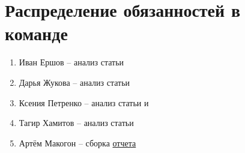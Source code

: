 
\section{Распределение обязанностей в команде}

\begin{enumerate}
    \item Иван Ершов -- анализ статьи \cite{pipedream}
    \item Дарья Жукова -- анализ статьи \cite{beginning}
    \item Ксения Петренко -- анализ статьи \cite{shoeybi2019megatron} и \cite{vaswani2017attention}
    \item Тагир Хамитов -- анализ статьи \cite{DBLP}
    \item Артём Макогон -- сборка \href{https://github.com/makogon2907/HSE-Practice-Fall-2022}{отчета}
\end{enumerate}